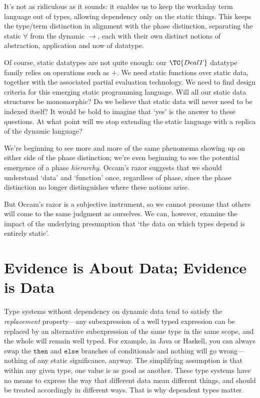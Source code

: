 \documentclass{fundam}
\begin{document}
It's not as ridiculous as it sounds: it enables us to keep the
workaday term language out of types, allowing dependency only on the
static things.  This keeps the type/term distinction in alignment with
the phase distinction, separating the static $\forall$ from
the dynamic $\to$, each with their own distinct notions of
abstraction, application and now of datatype.

Of course, static datatypes are not quite enough: our $\TC{DealT}$
datatype family relies on operations such as $\plus$. We need static
functions over static data, together with the associated partial
evaluation technology. We need to find design criteria for this
emerging static programming language. Will all our static data
structures be monomorphic? Do we believe that static data will never
need to be indexed itself? It would be bold to imagine that `yes' is
the answer to these questions.  At what point will we stop extending
the static language with a replica of the dynamic language?

We're beginning to see more and more of the same phenomema showing up
on either side of the phase distinction; we're even beginning to see
the potential emergence of a phase \emph{hierarchy}. Occam's razor
suggests that we should understand `data' and `function' once,
regardless of phase, since the phase distinction no longer
distinguishes where these notions arise.

But Occam's razor is a subjective instrument, so we cannot presume
that others will come to the same judgment as ourselves. We can,
however, examine the impact of the underlying presumption that `the
data on which types depend is entirely static'.


\section{Evidence is About Data; Evidence is Data}
\label{sec:evidence}

Type systems without dependency on dynamic data tend to satisfy the
\emph{replacement} property---any subexpression of a well typed
expression can be replaced by an alternative subexpression of the same
type in the same scope, and the whole will remain well typed. For
example, in Java or Haskell, you can always swap the $\texttt{then}$
and $\texttt{else}$ branches of conditionals and nothing will go
wrong---nothing of any static significance, anyway. The simplifying
assumption is that within any given type, one value is as good as
another. These type systems have no means to express the way that
different data mean different things, and should be treated accordingly
in different ways. That is why dependent types matter.
\end{document}
